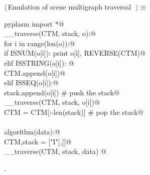 \documentclass[11pt,oneside]{article}	%
\begin{document}
\begin{flushleft} \small \label{scrap31}
$\langle\,$Emulation of scene multigraph traversal\nobreak\ {\footnotesize {}}$\,\rangle\equiv$
\vspace{-1ex}
\begin{list}{}{} \item
\mbox{}\verb@from pyplasm import *@\\
\mbox{}\verb@def __traverse(CTM, stack, o):@\\
\mbox{}\verb@    for i in range(len(o)):@\\
\mbox{}\verb@        if ISNUM(o[i]): print o[i], REVERSE(CTM)@\\
\mbox{}\verb@        elif ISSTRING(o[i]): @\\
\mbox{}\verb@            CTM.append(o[i])@\\
\mbox{}\verb@        elif ISSEQ(o[i]):@\\
\mbox{}\verb@            stack.append(o[i])            # push the stack@\\
\mbox{}\verb@            __traverse(CTM, stack, o[i])@\\
\mbox{}\verb@            CTM = CTM[:-len(stack)]       # pop the stack@\\
\mbox{}\verb@@\\
\mbox{}\verb@def algorithm(data):@\\
\mbox{}\verb@    CTM,stack = ["I"],[]@\\
\mbox{}\verb@    __traverse(CTM, stack, data)  @\\
\mbox{}\verb@@{\NWsep}
\end{list}
\vspace{-1ex}
\footnotesize\addtolength{\baselineskip}{-1ex}
\begin{list}{}{\setlength{\itemsep}{-\parsep}\setlength{\itemindent}{-\leftmargin}}
\item {\NWtxtMacroNoRef}.
\end{list}
\end{flushleft}
\end{document}
